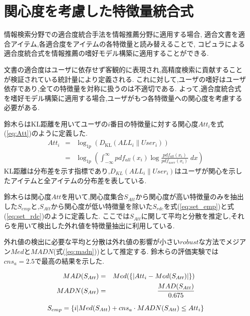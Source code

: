 \section{関心度を考慮した特徴量統合式}
情報検索分野での適合度統合手法を情報推薦分野に適用する場合,
適合文書を適合アイテム,各適合度をアイテムの各特徴量と読み替えることで,
コピュラによる適合度統合式を情報推薦の嗜好モデル構築に適用することができる.\par
文書の適合度はユーザに依存せず客観的に表現され,高精度検索に貢献することが検証されている統計量により定義される.
これに対して,ユーザの嗜好はユーザ依存であり,全ての特徴量を対称に扱うのは不適切である.
よって,適合度統合式を嗜好モデル構築に適用する場合,ユーザがもつ各特徴量への関心度を考慮する必要がある.\par
鈴木ら\cite{Suzuki}はKL距離\cite{kl-divergence}を用いてユーザの$i$番目の特徴量に対する関心度$Att_{i}$を式(\ref{eq:Att})のように定義した.
\begin{eqnarray}
     \label{eq:Att}
     {Att}_{i} &=& \log_{1p}(D_{\mathrm{KL}}(ALL_i\|User_i)) \nonumber \\
               &=& \log_{1p}(\int_{-\infty}^{\infty} pdf_{all}(x_{i}) \log \frac{pdf_{all}(x_{i})}{pdf_{user}(x_{i})} \; dx)
\end{eqnarray}
KL距離は分布差を示す指標であり,$D_{KL}(ALL_i\|User_i)$はユーザが関心を示したアイテムと全アイテムの分布差を表している.\par
鈴木らは関心度$Att$を用いて,関心度集合$S_{Att}$から関心度が高い特徴量のみを抽出した$S_{emp}$と,$S_{Att}$から関心度が低い特徴量を除いた$S_{rdc}$を式(\ref{eq:set_emp})と式(\ref{eq:set_rdc})のように定義した.
ここでは$S_{Att}$に関して平均と分散を推定し,それらを用いて検出した外れ値を特徴量抽出に利用している.\par
外れ値の検出に必要な平均と分散は外れ値の影響が小さい$robust$な方法\cite{robust-stat}でメジアン$Med$と$MADN$(式(\ref{eq:madn}))として推定する.
鈴木らの評価実験では$cns_a=2.5$で最高の結果を示した.

\begin{eqnarray}
    \label{eq:mad}
    \centering
    MAD(S_{Att}) &=& Med(\{|Att_i - Med(S_{Att})|\}) \\
    \label{eq:madn}
    \centering
    MADN(S_{Att}) &=& \frac{MAD(S_{Att})}{0.675}
\end{eqnarray}

\begin{equation}
\label{eq:set_emp}
 \centering
S_{emp}=\{i|Med(S_{Att})+cns_a\cdot MADN(S_{Att})\leq Att_i\}
\end{equation}

